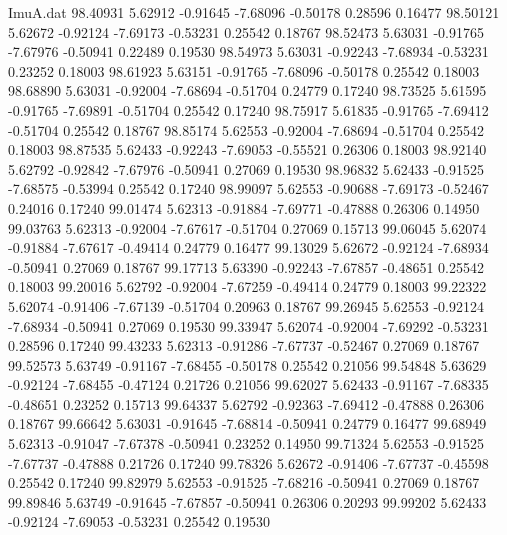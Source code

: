 \begin{filecontents}{ImuA.dat}
  98.40931    5.62912   -0.91645   -7.68096   -0.50178    0.28596    0.16477
  98.50121    5.62672   -0.92124   -7.69173   -0.53231    0.25542    0.18767
  98.52473    5.63031   -0.91765   -7.67976   -0.50941    0.22489    0.19530
  98.54973    5.63031   -0.92243   -7.68934   -0.53231    0.23252    0.18003
  98.61923    5.63151   -0.91765   -7.68096   -0.50178    0.25542    0.18003
  98.68890    5.63031   -0.92004   -7.68694   -0.51704    0.24779    0.17240
  98.73525    5.61595   -0.91765   -7.69891   -0.51704    0.25542    0.17240
  98.75917    5.61835   -0.91765   -7.69412   -0.51704    0.25542    0.18767
  98.85174    5.62553   -0.92004   -7.68694   -0.51704    0.25542    0.18003
  98.87535    5.62433   -0.92243   -7.69053   -0.55521    0.26306    0.18003
  98.92140    5.62792   -0.92842   -7.67976   -0.50941    0.27069    0.19530
  98.96832    5.62433   -0.91525   -7.68575   -0.53994    0.25542    0.17240
  98.99097    5.62553   -0.90688   -7.69173   -0.52467    0.24016    0.17240
  99.01474    5.62313   -0.91884   -7.69771   -0.47888    0.26306    0.14950
  99.03763    5.62313   -0.92004   -7.67617   -0.51704    0.27069    0.15713
  99.06045    5.62074   -0.91884   -7.67617   -0.49414    0.24779    0.16477
  99.13029    5.62672   -0.92124   -7.68934   -0.50941    0.27069    0.18767
  99.17713    5.63390   -0.92243   -7.67857   -0.48651    0.25542    0.18003
  99.20016    5.62792   -0.92004   -7.67259   -0.49414    0.24779    0.18003
  99.22322    5.62074   -0.91406   -7.67139   -0.51704    0.20963    0.18767
  99.26945    5.62553   -0.92124   -7.68934   -0.50941    0.27069    0.19530
  99.33947    5.62074   -0.92004   -7.69292   -0.53231    0.28596    0.17240
  99.43233    5.62313   -0.91286   -7.67737   -0.52467    0.27069    0.18767
  99.52573    5.63749   -0.91167   -7.68455   -0.50178    0.25542    0.21056
  99.54848    5.63629   -0.92124   -7.68455   -0.47124    0.21726    0.21056
  99.62027    5.62433   -0.91167   -7.68335   -0.48651    0.23252    0.15713
  99.64337    5.62792   -0.92363   -7.69412   -0.47888    0.26306    0.18767
  99.66642    5.63031   -0.91645   -7.68814   -0.50941    0.24779    0.16477
  99.68949    5.62313   -0.91047   -7.67378   -0.50941    0.23252    0.14950
  99.71324    5.62553   -0.91525   -7.67737   -0.47888    0.21726    0.17240
  99.78326    5.62672   -0.91406   -7.67737   -0.45598    0.25542    0.17240
  99.82979    5.62553   -0.91525   -7.68216   -0.50941    0.27069    0.18767
  99.89846    5.63749   -0.91645   -7.67857   -0.50941    0.26306    0.20293
  99.99202    5.62433   -0.92124   -7.69053   -0.53231    0.25542    0.19530

\end{filecontents}
